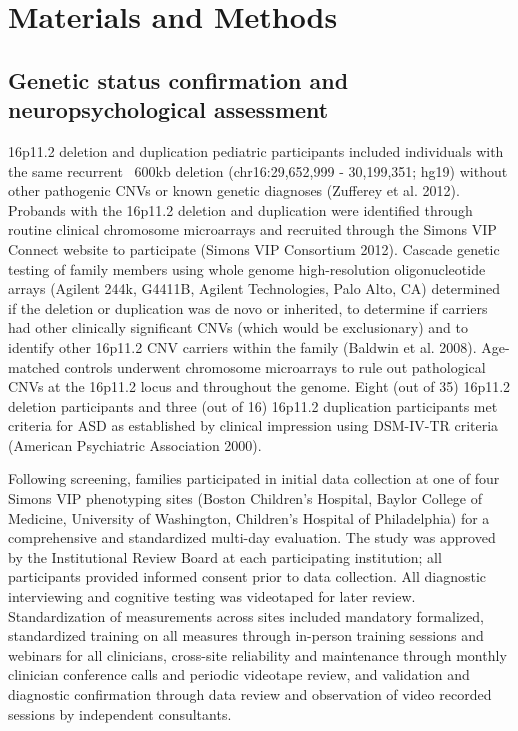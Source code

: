 \documentclass{article}
\begin{document}
\section*{Materials and Methods}  
\subsection*{Genetic status confirmation and neuropsychological assessment}
16p11.2 deletion and duplication pediatric participants included individuals with the same recurrent ~600kb deletion (chr16:29,652,999 - 30,199,351; hg19) without other pathogenic CNVs or known genetic diagnoses (Zufferey et al. 2012).  Probands with the 16p11.2 deletion and duplication were identified through routine clinical chromosome microarrays and recruited through the Simons VIP Connect website to participate (Simons VIP Consortium 2012).  Cascade genetic testing of family members using whole genome high-resolution oligonucleotide arrays (Agilent 244k, G4411B, Agilent Technologies, Palo Alto, CA) determined if the deletion or duplication was de novo or inherited, to determine if carriers had other clinically significant CNVs (which would be exclusionary) and to identify other 16p11.2 CNV carriers within the family (Baldwin et al. 2008). Age-matched controls underwent chromosome microarrays to rule out pathological CNVs at the 16p11.2 locus and throughout the genome. Eight (out of 35) 16p11.2 deletion participants and three (out of 16) 16p11.2 duplication participants met criteria for ASD as established by clinical impression using DSM-IV-TR criteria (American Psychiatric Association 2000).

\medskip

Following screening, families participated in initial data collection at one of four Simons VIP phenotyping sites (Boston Children’s Hospital, Baylor College of Medicine, University of Washington, Children’s Hospital of Philadelphia) for a comprehensive and standardized multi-day evaluation.  The study was approved by the Institutional Review Board at each participating institution; all participants provided informed consent prior to data collection. All diagnostic interviewing and cognitive testing was videotaped for later review. Standardization of measurements across sites included mandatory formalized, standardized training on all measures through in-person training sessions and webinars for all clinicians, cross-site reliability and maintenance through monthly clinician conference calls and periodic videotape review, and validation and diagnostic confirmation through data review and observation of video recorded sessions by independent consultants. 
\medskip
\end{document}
